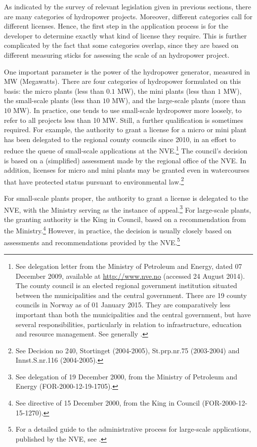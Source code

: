 As indicated by the survey of relevant legislation given in previous sections, there are many categories of hydropower projects. Moreover, different categories call for different licenses. Hence, the first step in the application process is for the developer to determine exactly what kind of license they require. This is further complicated by the fact that some categories overlap, since they are based on different measuring sticks for assessing the scale of an hydropower project. 

One important parameter is the power of the hydropower generator, measured in MW (Megawatts). There are four categories of hydropower formulated on this basis: the micro plants (less than $0.1$ MW), the mini plants (less than $1$ MW), the small-scale plants (less than $10$ MW), and the large-scale plants (more than $10$ MW). In practice, one tends to use small-scale hydropower more loosely, to refer to all projects less than 10 MW. Still, a further qualification is sometimes required. For example, the authority to grant a license for a micro or mini plant has been delegated to the regional county councils since 2010, in an effort to reduce the queue of small-scale applications at the NVE.\footnote{See delegation letter from the Ministry of Petroleum and Energy, dated 07 December 2009, available at \url{http://www.nve.no} (accessed 24 August 2014). The county council is an elected regional government institution situated between the municipalities and the central government. There are 19 county councils in Norway as of 01 January 2015. They are comparatively less important than both the municipalities and the central government, but have several  responsibilities, particularly in relation to infrastructure, education and resource management. See generally \cite{berg15}.} The council's decision is based on a (simplified) assessment made by the regional office of the NVE. In addition, licenses for micro and mini plants may be granted even in watercourses that have protected status pursuant to environmental law.\footnote{See Decision no 240, Stortinget (2004-2005), St.prp.nr.75 (2003-2004) and Innst.S.nr.116 (2004-2005).}

For small-scale plants proper, the authority to grant a license is delegated to the NVE, with the Ministry serving as the instance of appeal.\footnote{See delegation of 19 December 2000, from the Ministry of Petroleum and Energy (FOR-2000-12-19-1705).} For large-scale plants, the granting authority is the King in Council, based on a recommendation from the Ministry.\footnote{See directive of 15 December 2000, from the King in Council (FOR-2000-12-15-1270).} However, in practice, the decision is usually closely based on assessments and recommendations provided by the NVE.\footnote{For a detailed guide to the administrative process for large-scale applications, published by the NVE, see \cite{stokker10}.}


